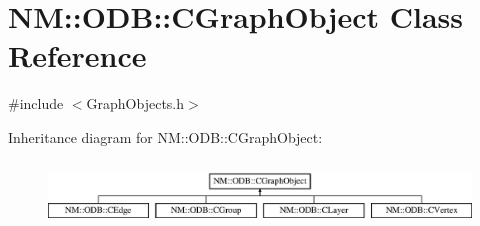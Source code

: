 \hypertarget{class_n_m_1_1_o_d_b_1_1_c_graph_object}{}\section{N\+M\+:\+:O\+D\+B\+:\+:C\+Graph\+Object Class Reference}
\label{class_n_m_1_1_o_d_b_1_1_c_graph_object}


{\ttfamily \#include $<$Graph\+Objects.\+h$>$}

Inheritance diagram for N\+M\+:\+:O\+D\+B\+:\+:C\+Graph\+Object\+:\begin{figure}[H]
\begin{center}
\leavevmode
\includegraphics[height=1.750000cm]{class_n_m_1_1_o_d_b_1_1_c_graph_object}
\end{center}
\end{figure}
